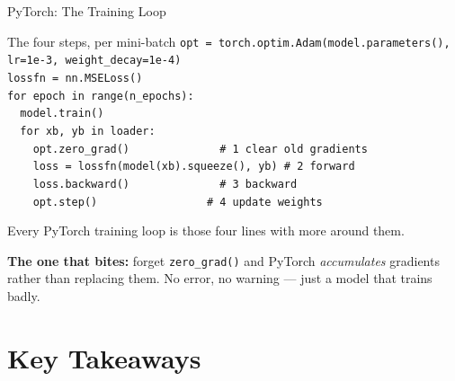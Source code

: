 \documentclass[aspectratio=169, 11pt]{beamer}
\begin{document}
\begin{frame}{PyTorch: The Training Loop}
  \begin{examplebox}{The four steps, per mini-batch}
    {\tiny\linespread{1.2}\selectfont
    \texttt{opt = torch.optim.Adam(model.parameters(), lr=1e-3, weight\_decay=1e-4)}\\
    \texttt{lossfn = nn.MSELoss()}\\[3pt]
    \texttt{for epoch in range(n\_epochs):}\\
    \texttt{\ \ model.train()}\\
    \texttt{\ \ for xb, yb in loader:}\\
    \texttt{\ \ \ \ opt.zero\_grad()\ \ \ \ \ \ \ \ \ \ \ \ \ \ \# 1 clear old gradients}\\
    \texttt{\ \ \ \ loss = lossfn(model(xb).squeeze(), yb)\ \# 2 forward}\\
    \texttt{\ \ \ \ loss.backward()\ \ \ \ \ \ \ \ \ \ \ \ \ \ \# 3 backward}\\
    \texttt{\ \ \ \ opt.step()\ \ \ \ \ \ \ \ \ \ \ \ \ \ \ \ \ \# 4 update weights}
    }
  \end{examplebox}
  Every PyTorch training loop is those four lines with more around them.

  \vspace{0.1cm}
  \textbf{The one that bites:} forget \texttt{zero\_grad()} and PyTorch \emph{accumulates} gradients
  rather than replacing them. No error, no warning --- just a model that trains badly.
\end{frame}

\section{Key Takeaways}

\end{document}

